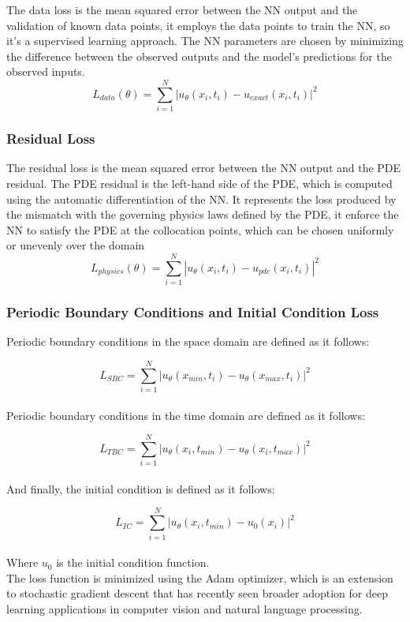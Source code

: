 \documentclass{article}
\begin{document}
The data loss is the mean squared error between the NN output and the validation of known data points, it employs the data points to train the NN, so it's a supervised learning approach.
The NN parameters are chosen by minimizing the difference between the observed outputs and the model’s predictions for the observed inputs.
$$
L_{data}(\theta) = \sum_{i=1}^{N} |u_\theta(x_i,t_i) - u_{exact}(x_i,t_i)|^2
$$

\subsubsection*{Residual Loss}

The residual loss is the mean squared error between the NN output and the PDE residual. The PDE residual is the left-hand side of the PDE, which is computed using the automatic differentiation of the NN.
It represents the loss produced by the mismatch with the governing physics laws defined by the PDE, it enforce the NN to satisfy the PDE at the collocation points, which can be chosen uniformly or unevenly over the domain
$$
L_{physics}(\theta) = \sum_{i=1}^{N} |u_\theta(x_i,t_i) - u_{pde}(x_i,t_i)|^2
$$

\subsubsection*{Periodic Boundary Conditions and Initial Condition Loss}

Periodic boundary conditions in the space domain are defined as it follows:

$$
L_{SBC} = \sum_{i=1}^{N} |u_\theta(x_{min},t_i) - u_\theta(x_{max},t_i)|^2
$$
\\
Periodic boundary conditions in the time domain are defined as it follows:

$$
L_{TBC} = \sum_{i=1}^{N} |u_\theta(x_i,t_{min}) - u_\theta(x_i,t_{max})|^2
$$
\\
And finally, the initial condition is defined as it follows:

$$
L_{IC} = \sum_{i=1}^{N} |u_\theta(x_i,t_{min}) - u_{0}(x_i)|^2
$$
\\
Where $u_0$ is the initial condition function.\\

The loss function is minimized using the Adam optimizer, which is an extension to stochastic gradient descent that has recently seen broader adoption for deep learning applications in computer vision and natural language processing.\\
\end{document}
